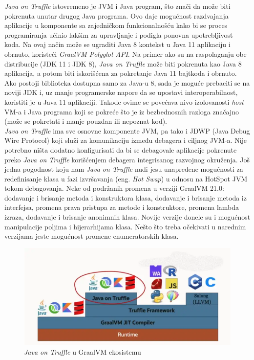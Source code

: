 \documentclass[a4paper]{article}
\begin{document}
\emph{Java on Truffle} istovremeno je JVM i Java program, što znači da može biti pokrenuta unutar drugog Java programa. Ovo daje mogućnost razdvajanja aplikacije u komponente sa zajedničkom funkcionalnošću kako bi se proces programiranja učinio lakšim za upravljanje i podigla ponovna upotrebljivost koda. Na ovaj način može se ugraditi Java 8 kontekst u Java 11 aplikaciju i obrnuto, koristeći \emph{GraalVM Polyglot API}. Na primer ako su na raspolaganju obe distribucije (JDK 11 i JDK 8), \emph{Java on Truffle} može biti pokrenuta kao Java 8 aplikacija, a potom biti iskorišćena za pokretanje Java 11 bajtkoda i obrnuto. Ako postoji biblioteka dostupna samo za Java-u 8, sada je moguće prebaciti se na noviji JDK i, uz manje programerske napore da se upostavi interoperabilnost, koristiti je u Java 11 aplikaciji. Takođe ovime se povećava nivo izolovanosti \emph{host} VM-a i Java programa koji se pokreće što je iz bezbednosnih razloga značajno (može se pokretati i manje pouzdan ili nepoznat kod). \\


\emph{Java on Truffle} ima sve osnovne komponente JVM, pa tako i JDWP (Java Debug Wire Protocol) koji služi za komunikaciju između debagera i ciljnog JVM-a. Nije potrebno ništa dodatno konfigurisati da bi se debagovale aplikacije pokrenute preko \emph{Java on Truffle} korišćenjem debagera integrisanog razvojnog okruženja. Još jedna pogodnost koju nam \emph{Java on Truffle} nudi jesu unapređene mogućnosti za redefinisanje klasa u fazi izvršavanja (eng. \emph{Hot Swap}) u odnosu na HotSpot JVM tokom debagovanja. Neke od podržanih promena u verziji GraalVM 21.0: dodavanje i brisanje metoda i konstruktora klasa, dodavanje i brisanje metoda iz interfejsa, promena prava pristupa za metode i konstruktore, promena lambda izraza, dodavanje i brisanje anonimnih klasa. Novije verzije donele su i mogućnost manipulacije poljima i hijerarhijama klasa. Nešto što treba očekivati u narednim verzijama jeste mogućnost promene enumeratorskih klasa. \\


\begin{figure}
	\begin{center}
	\includegraphics[scale=0.35]{imgs/java_on_truffle.png}
	\end{center}
	\caption{\emph{Java on Truffle} u GraalVM ekosistemu}
	\label{fig: java on truffle}
\end{figure}
\end{document}
